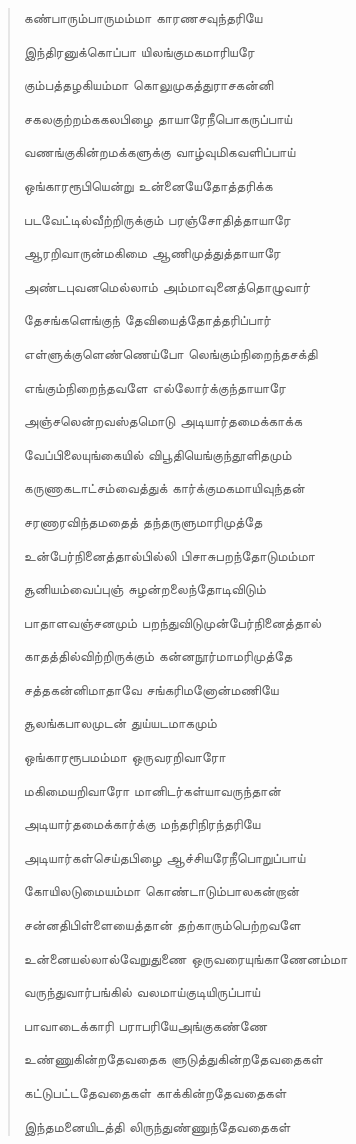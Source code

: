 \documentclass{article}
\begin{document}
\begin{quotation}
{கண்பாரும்பாருமம்மா காரணசவுந்தரியே

இந்திரனுக்கொப்பா யிலங்குமகமாரியரே

கும்பத்தழகியம்மா கொலுமுகத்துராசகன்னி

சகலகுற்றம்ககலபிழை தாயாரேநீபொகருப்பாய்

வணங்குகின்றமக்களுக்கு வாழ்வுமிகவளிப்பாய்

ஒங்காரரூபியென்று உன்னையேதோத்தரிக்க

படவேட்டில்வீற்றிருக்கும் பரஞ்சோதித்தாயாரே

ஆரறிவாருன்மகிமை ஆணிமுத்துத்தாயாரே

அண்டபுவனமெல்லாம் அம்மாவுனைத்தொழுவார்

தேசங்களெங்குந் தேவியைத்தோத்தரிப்பார்

எள்ளுக்குளெண்ணெய்போ லெங்கும்நிறைந்தசக்தி

எங்கும்நிறைந்தவளே எல்லாேர்க்குந்தாயாரே

அஞ்சலென்றவஸ்தமொடு அடியார்தமைக்காக்க

வேப்பிலையுங்கையில் விபூதியெங்குந்தூளிதமும்

கருணாகடாட்சம்வைத்துக் கார்க்குமகமாயிவுந்தன்

சரணாரவிந்தமதைத் தந்தருளுமாரிமுத்தே

உன்பேர்நினைத்தால்பில்லி பிசாசுபறந்தோடுமம்மா

சூனியம்வைப்புஞ் சுழன்றலைந்தோடிவிடும்

பாதாளவஞ்சனமும் பறந்துவிடுமுன்பேர்நினைத்தால்

காதத்தில்விற்றிருக்கும்‌ கன்னநூர்மாமரிமுத்தே

சத்தகன்னிமாதாவே சங்கரிமனோன்மணியே

சூலங்கபாலமுடன் துய்யடமாகமும்

ஒங்காரரூபமம்மா ஒருவரறிவாரோ

மகிமையறிவாரோ மானிடர்கள்யாவருந்தான்

அடியார்தமைக்கார்க்கு மந்தரிநிரந்தரியே

அடியார்கள்செய்தபிழை ஆச்சியரேநீபொறுப்பாய்

கோயிலடுமையம்மா கொண்டாடும்பாலகன்றான்

சன்னதிபிள்ளையைத்தான் தற்காரும்பெற்றவளே

உன்னையல்லால்வேறுதுணை ஒருவரையுங்காணேனம்மா

வருந்துவார்பங்கில் வலமாய்குடியிருப்பாய்

பாவாடைக்காரி பராபரியேஅங்குகண்ணே

உண்ணுகின்றதேவதைக ளுடுத்துகின்றதேவதைகள்

கட்டுபட்டதேவதைகள் காக்கின்றதேவதைகள்

இந்தமனையிடத்தி லிருந்துண்ணுந்தேவதைகள்

}
\end{quotation}
\end{document}
